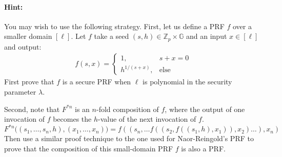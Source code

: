 \documentclass[11pt]{article}
\newenvironment{solution}{\color{blue}\noindent{\bf Solution}\hspace*{1em}}{\qed\medskip}
\newcommand{\qed}{\mbox{}\hspace*{\fill}\nolinebreak\mbox{$\rule{0.6em}{0.6em}$}} %
\numberwithin{equation}{section}
\newcommand{\bbG}{\mathbb{G}}
\newcommand{\bbZ}{\mathbb{Z}}
\newif\ifsol
\begin{document}
\paragraph{Hint:} You may wish to use the following strategy. First, let us define a PRF $f$ over a smaller domain $[\ell]$. Let $f$ take a seed $(s,h) \in \bbZ_p \times \bbG$ and an input $x \in [\ell]$ and output:
\begin{align*}
    f(s,x) = 
    \begin{cases}
        1, & s+x = 0\\
        h^{1/(s+x)}, &\text{else}
    \end{cases}
\end{align*}
First prove that $f$ is a secure PRF when $\ell$ is polynomial in the security parameter $\lambda$.

Second, note that $F^{*n}$ is an $n$-fold composition of $f$, where the output of one invocation of $f$ becomes the $h$-value of the next invocation of $f$.
\[F^{*n}\big((s_1, \dots, s_n, h), (x_1, \dots, x_n)\big) = f((s_n, \dots f((s_2, f((s_1, h), x_1)), x_2) \dots), x_n)\]
Then use a similar proof technique to the one used for Naor-Reingold's PRF to prove that the composition of this small-domain PRF $f$ is also a PRF.

\ifsol
\pagebreak
\begin{solution}
TBD
\end{solution}
\fi
\end{document}
